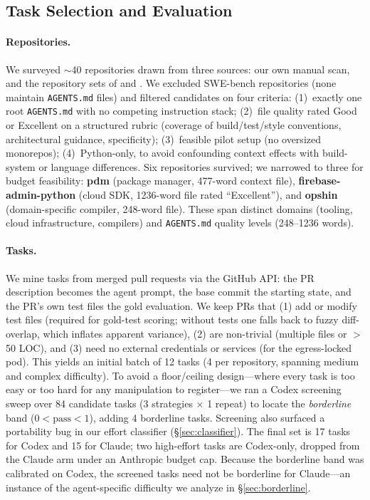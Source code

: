 \documentclass[11pt]{article}
\newcommand{\agentsmd}{\texttt{AGENTS.md}}
\begin{document}
\subsection{Task Selection and Evaluation}

\paragraph{Repositories.}
We surveyed ${\sim}$40 repositories drawn from three sources: our own manual scan, and the repository sets of \citet{paper1} and \citet{paper2}.
We excluded SWE-bench repositories (none maintain \agentsmd{} files) and filtered candidates on four criteria: (1)~exactly one root \agentsmd{} with no competing instruction stack; (2)~file quality rated Good or Excellent on a structured rubric (coverage of build/test/style conventions, architectural guidance, specificity); (3)~feasible pilot setup (no oversized monorepos); (4)~Python-only, to avoid confounding context effects with build-system or language differences.
Six repositories survived; we narrowed to three for budget feasibility:
\textbf{pdm} (package manager, 477-word context file),
\textbf{firebase-admin-python} (cloud SDK, 1236-word file rated ``Excellent''), and
\textbf{opshin} (domain-specific compiler, 248-word file).
These span distinct domains (tooling, cloud infrastructure, compilers) and \agentsmd{} quality levels (248--1236 words).

\paragraph{Tasks.}
We mine tasks from merged pull requests via the GitHub API: the PR description becomes the agent prompt, the base commit the starting state, and the PR's own test files the gold evaluation.
We keep PRs that (1) add or modify test files (required for gold-test scoring; without tests one falls back to fuzzy diff-overlap, which inflates apparent variance), (2) are non-trivial (multiple files or $>$50 LOC), and (3) need no external credentials or services (for the egress-locked pod).
This yields an initial batch of 12 tasks (4 per repository, spanning medium and complex difficulty).
To avoid a floor/ceiling design---where every task is too easy or too hard for any manipulation to register---we ran a Codex screening sweep over 84 candidate tasks (3 strategies $\times$ 1 repeat) to locate the \emph{borderline} band ($0{<}\text{pass}{<}1$), adding 4 borderline tasks.
Screening also surfaced a portability bug in our effort classifier (\S\ref{sec:classifier}).
The final set is 17 tasks for Codex and 15 for Claude; two high-effort tasks are Codex-only, dropped from the Claude arm under an Anthropic budget cap.
Because the borderline band was calibrated on Codex, the screened tasks need not be borderline for Claude---an instance of the agent-specific difficulty we analyze in \S\ref{sec:borderline}.
\end{document}
